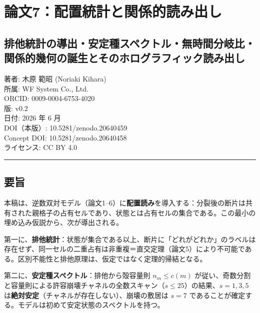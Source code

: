 \documentclass[
]{ltjsarticle}
\author{}
\date{}
\begin{document}
\section{論文7：配置統計と関係的読み出し}\label{ux8ad6ux65877ux914dux7f6eux7d71ux8a08ux3068ux95a2ux4fc2ux7684ux8aadux307fux51faux3057}

\subsection{排他統計の導出・安定種スペクトル・無時間分岐比・関係的幾何の誕生とそのホログラフィック読み出し}\label{ux6392ux4ed6ux7d71ux8a08ux306eux5c0eux51faux5b89ux5b9aux7a2eux30b9ux30daux30afux30c8ux30ebux7121ux6642ux9593ux5206ux5c90ux6bd4ux95a2ux4fc2ux7684ux5e7eux4f55ux306eux8a95ux751fux3068ux305dux306eux30dbux30edux30b0ux30e9ux30d5ux30a3ux30c3ux30afux8aadux307fux51faux3057}

著者: 木原 範昭 (Noriaki Kihara)\\
所属: WF System Co., Ltd.\\
ORCID: 0009-0004-6753-4020\\
版: v0.2\\
日付: 2026 年 6 月\\
DOI（本版）: 10.5281/zenodo.20640459\\
Concept DOI: 10.5281/zenodo.20640458\\
ライセンス: CC BY 4.0

\begin{center}\rule{0.5\linewidth}{0.5pt}\end{center}

\subsection{要旨}\label{ux8981ux65e8}

本稿は、逆数双対モデル（論文1--6）に\textbf{配置読み}を導入する：分裂後の断片は共有された親格子の占有セルであり、状態とは占有セルの集合である。この最小の埋め込み仮説から、次が導出される。

第一に、\textbf{排他統計}：状態が集合である以上、断片に「どれがどれか」のラベルは存在せず、同一セルの二重占有は非重複＝直交定理（論文5）により不可能である。区別不能性と排他原理は、仮定ではなく定理的帰結となる。

第二に、\textbf{安定種スペクトル}：排他から殻容量則 \(n_m\le c(m)\)
が従い、奇数分割と容量則による許容崩壊チャネルの全数スキャン（\(s\le25\)）の結果、\(s=1,3,5\)
は\textbf{絶対安定}（チャネルが存在しない）、崩壊の敷居は \(s=7\)
であることが確定する。モデルは初めて安定状態のスペクトルを持つ。
\end{document}
